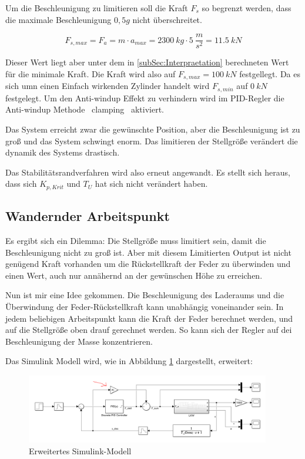 Um die Beschleunigung zu limitieren soll die Kraft $F_{s}$ so begrenzt werden, dass die maximale Beschleunigung $0,5 g$ nicht überschreitet.

\begin{equation}
	F_{s, max} = F_{a} = m \cdot a_{max} = \SI{2300}{kg} \cdot \SI{5}{\frac{m}{s^2}} = \SI{11,5}{kN}
\end{equation}

Dieser Wert liegt aber unter dem in \ref{subSec:Interpraetation} berechneten Wert für die minimale Kraft.
Die Kraft wird also auf $F_{s, max} = \SI{100}{kN}$ festgellegt.
Da es sich umn einen Einfach wirkenden Zylinder handelt wird $F_{s, min}$ auf $\SI{0}{kN} $ festgelegt.
Um den Anti-windup Effekt zu verhindern wird im PID-Regler die \glqq Anti-windup Methode\grqq ~ \glqq clamping\grqq ~ aktiviert.


Das System erreicht zwar die gewünschte Position, aber die 
Beschleunigung ist zu groß und das System schwingt enorm. Das limitieren der Stellgröße verändert die dynamik des Systems drastisch.


Das Stabilitätsrandverfahren wird also erneut angewandt. 
Es stellt sich heraus, dass sich  $K_{p, Krit}$ und $T_{U}$ hat sich nicht verändert haben.




\subsection{Wandernder Arbeitspunkt}
Es ergibt sich ein Dilemma:
Die Stellgröße muss limitiert sein, damit die Beschleunigung nicht zu groß ist. 
Aber mit diesem Limitierten Output ist nicht genügend Kraft vorhanden um die Rückstellkraft der Feder zu überwinden und einen Wert, 
auch nur annähernd an der gewünschen Höhe zu erreichen.

Nun ist mir eine Idee gekommen.
Die Beschleunigung des Laderaums und die Überwindung der Feder-Rückstellkraft kann unabhängig voneinander sein.
In jedem beliebigen Arbeitspunkt kann die Kraft der Feder berechnet werden, und auf die Stellgröße oben drauf gerechnet werden.
So kann sich der Regler auf dei Beschleunigung der Masse konzentrieren.

Das Simulink Modell wird, wie in Abbildung \ref{wandernderArbeitspunkt} dargestellt, erweitert:


\begin{figure}[hbt] 
	\centering
		\includegraphics[width=0.95\textwidth]{Bilder/WandernderArbeitspunkt.PNG}
	\caption{Erweitertes Simulink-Modell}
	\label{wandernderArbeitspunkt}
\end{figure}


